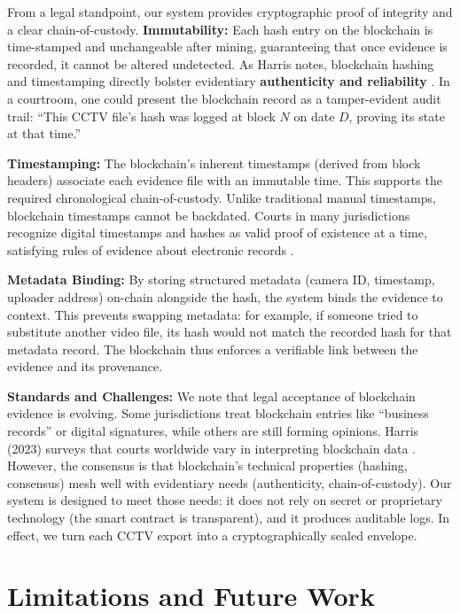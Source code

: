 \documentclass[conference]{IEEEtran}
\begin{document}
From a legal standpoint, our system provides cryptographic proof of integrity and a clear chain-of-custody. \textbf{Immutability:} Each hash entry on the blockchain is time-stamped and unchangeable after mining, guaranteeing that once evidence is recorded, it cannot be altered undetected. As Harris notes, blockchain hashing and timestamping directly bolster evidentiary \textbf{authenticity and reliability} \cite{b4}. In a courtroom, one could present the blockchain record as a tamper-evident audit trail: ``This CCTV file's hash was logged at block $N$ on date $D$, proving its state at that time.''

\textbf{Timestamping:} The blockchain's inherent timestamps (derived from block headers) associate each evidence file with an immutable time. This supports the required chronological chain-of-custody. Unlike traditional manual timestamps, blockchain timestamps cannot be backdated. Courts in many jurisdictions recognize digital timestamps and hashes as valid proof of existence at a time, satisfying rules of evidence about electronic records \cite{b4}.

\textbf{Metadata Binding:} By storing structured metadata (camera ID, timestamp, uploader address) on-chain alongside the hash, the system binds the evidence to context. This prevents swapping metadata: for example, if someone tried to substitute another video file, its hash would not match the recorded hash for that metadata record. The blockchain thus enforces a verifiable link between the evidence and its provenance.

\textbf{Standards and Challenges:} We note that legal acceptance of blockchain evidence is evolving. Some jurisdictions treat blockchain entries like ``business records'' or digital signatures, while others are still forming opinions. Harris (2023) surveys that courts worldwide vary in interpreting blockchain data \cite{b4}. However, the consensus is that blockchain's technical properties (hashing, consensus) mesh well with evidentiary needs (authenticity, chain-of-custody). Our system is designed to meet those needs: it does not rely on secret or proprietary technology (the smart contract is transparent), and it produces auditable logs. In effect, we turn each CCTV export into a cryptographically sealed envelope.

\section{Limitations and Future Work}
\end{document}
